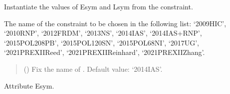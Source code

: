 \documentclass[letterpaper,10pt,english]{sphinxmanual}
\begin{document}
\begin{fulllineitems}
\label{\detokenize{source/api/setup_EsymLsym:nucleardatapy.setup_EsymLsym.SetupEsymLsym}}
\pysigstartsignatures
{}
\pysigstopsignatures
\sphinxAtStartPar
Instantiate the values of Esym and Lsym from the constraint.

\sphinxAtStartPar
The name of the constraint to be chosen in the     following list: ‘2009\sphinxhyphen{}HIC’, ‘2010\sphinxhyphen{}RNP’, ‘2012\sphinxhyphen{}FRDM’, ‘2013\sphinxhyphen{}NS’,     ‘2014\sphinxhyphen{}IAS’, ‘2014\sphinxhyphen{}IAS+RNP’, ‘2015\sphinxhyphen{}POL\sphinxhyphen{}208PB’, ‘2015\sphinxhyphen{}POL\sphinxhyphen{}120SN’,     ‘2015\sphinxhyphen{}POL\sphinxhyphen{}68NI’, ‘2017\sphinxhyphen{}UG’, ‘2021\sphinxhyphen{}PREXII\sphinxhyphen{}Reed’,     ‘2021\sphinxhyphen{}PREXII\sphinxhyphen{}Reinhard’, ‘2021\sphinxhyphen{}PREXII\sphinxhyphen{}Zhang’.
\begin{quote}\begin{description}
\sphinxAtStartPar
{} (\sphinxstyleliteralemphasis{\sphinxupquote{, }}) \textendash{} Fix the name of . Default value: ‘2014\sphinxhyphen{}IAS’.

\end{description}\end{quote}

\sphinxAtStartPar
{}

\begin{fulllineitems}
\label{\detokenize{source/api/setup_EsymLsym:nucleardatapy.setup_EsymLsym.SetupEsymLsym.Esym}}
\pysigstartsignatures
{}
\pysigstopsignatures
\sphinxAtStartPar
Attribute Esym.

\end{fulllineitems}



\end{fulllineitems}
\end{document}
